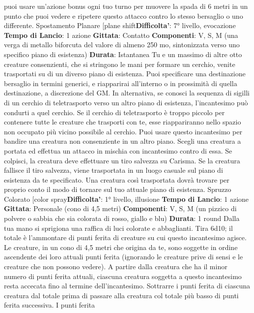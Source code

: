 \begin{multicols}{2}
puoi usare un’azione bonus ogni tuo turno per muovere
la spada di 6 metri in un punto che puoi vedere e
ripetere questo attacco contro lo stesso bersaglio o uno
differente.
Spostamento Planare
[plane shift\textbf{Difficolta'}:
7° livello, evocazione
\textbf{Tempo di Lancio}: 1 azione
\textbf{Gittata}: Contatto
\textbf{Componenti}: V, S, M (una verga di metallo biforcuta
del valore di almeno 250 mo, sintonizzata verso uno
specifico piano di esistenza)
\textbf{Durata}: Istantanea
Tu e un massimo di altre otto creature consenzienti,
che si stringono le mani per formare un cerchio, venite
trasportati su di un diverso piano di esistenza. Puoi
specificare una destinazione bersaglio in termini
generici, e riapparirai all’interno o in prossimità di quella
destinazione, a discrezione del GM.
In alternativa, se conosci la sequenza di sigilli di un
cerchio di teletrasporto verso un altro piano di
esistenza, l’incantesimo può condurti a quel cerchio. Se
il cerchio di teletrasporto è troppo piccolo per contenere
tutte le creature che trasporti con te, esse riappariranno
nello spazio non occupato più vicino possibile al
cerchio.
Puoi usare questo incantesimo per bandire una
creatura non consenziente in un altro piano. Scegli una
creatura a portata ed effettua un attacco in mischia con
incantesimo contro di essa. Se colpisci, la creatura
deve effettuare un tiro salvezza su Carisma. Se la
creatura fallisce il tiro salvezza, viene trasportata in un
luogo casuale sul piano di esistenza da te specificato.
Una creatura così trasportata dovrà trovare per proprio
conto il modo di tornare sul tuo attuale piano di
esistenza.
Spruzzo Colorato
[color spray\textbf{Difficolta'}:
1° livello, illusione
\textbf{Tempo di Lancio}: 1 azione
\textbf{Gittata}: Personale (cono di 4,5 metri)
\textbf{Componenti}: V, S, M (un pizzico di polvere o sabbia
che sia colorata di rosso, giallo e blu)
\textbf{Durata}: 1 round
Dalla tua mano si sprigiona una raffica di luci colorate e
abbaglianti. Tira 6d10; il totale è l’ammontare di punti
ferita di creature su cui questo incantesimo agisce. Le
creature, in un cono di 4,5 metri che origina da te, sono
soggette in ordine ascendente dei loro attuali punti
ferita (ignorando le creature prive di sensi e le creature
che non possono vedere).
A partire dalla creatura che ha il minor numero di punti
ferita attuali, ciascuna creatura soggetta a questo
incantesimo resta accecata fino al termine
dell’incantesimo. Sottrarre i punti ferita di ciascuna
creatura dal totale prima di passare alla creatura col
totale più basso di punti ferita successiva. I punti ferita

\end{multicols}
